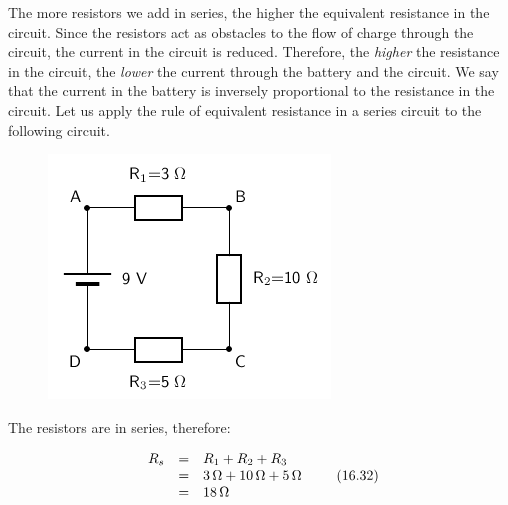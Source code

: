           \label{m38776*id64719}The more resistors we add in series, the higher the equivalent resistance in the circuit. Since the resistors act as obstacles to the flow of charge through the circuit, the current in the circuit is reduced. Therefore, the \textsl{higher} the resistance in the circuit, the \textsl{lower} the current through the battery and the circuit. We say that the current in the battery is inversely proportional to the resistance in the circuit. 
Let us apply the rule of equivalent resistance in a series circuit to the following circuit.\par 
          \label{m38776*id64722}
    \setcounter{subfigure}{0}
	\begin{figure}[H] %
    \begin{center}
    \label{m38776*id64726!!!underscore!!!media}\label{m38776*id64726!!!underscore!!!printimage}\includegraphics[width=0.4\columnwidth]{col11305.imgs/m38776_PG11C9_008.png} %
      \vspace{2pt}
    \vspace{.1in}
    \end{center}
 \end{figure}       
          \par 
          \label{m38776*id64732}The resistors are in series, therefore:\par 
          \label{m38776*id64736}\nopagebreak\noindent{}
    \begin{equation}
    \begin{array}{ccc}\hfill {R}_{s}& =& {R}_{1}+{R}_{2}+{R}_{3}\hfill \\ & =& 3\phantom{\rule{0.166667em}{0ex}}\mathrm{\Omega }+10\phantom{\rule{0.166667em}{0ex}}\mathrm{\Omega }+5\phantom{\rule{0.166667em}{0ex}}\mathrm{\Omega }\hfill \\ & =& 18\phantom{\rule{0.166667em}{0ex}}\mathrm{\Omega }\hfill \end{array}\tag{16.32}
      \end{equation}
\label{m38776*eip-186}
